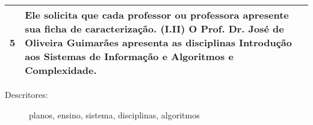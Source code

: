 \documentclass{article}
\begin{document}
\begin{longtable}{|p{0.2cm}|p{17cm}|}
 \\ \hline 
5 &
Ele solicita que cada professor ou professora apresente sua ficha de caracterização. 
(I.II) O Prof. Dr. José de Oliveira Guimarães apresenta as disciplinas Introdução aos Sistemas de Informação e Algoritmos e Complexidade.
 \\ \hline 

\end{longtable} 

\begin{description}
\item[Descritores: ] planos, ensino, sistema, disciplinas, algoritmos
\end{description}
\end{document}

